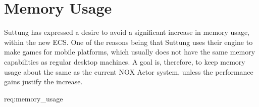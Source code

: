 \section{Memory Usage}
Suttung has expressed a desire to avoid a significant increase in memory usage,
within the new ECS.
One of the reasons being that Suttung uses their engine to
make games for mobile platforms, which usually does not have the same memory capabilities as regular desktop machines.
A goal is, therefore, to keep memory usage about the same as the current
NOX Actor system, unless the performance gains justify the increase.

{req:memory_usage}
